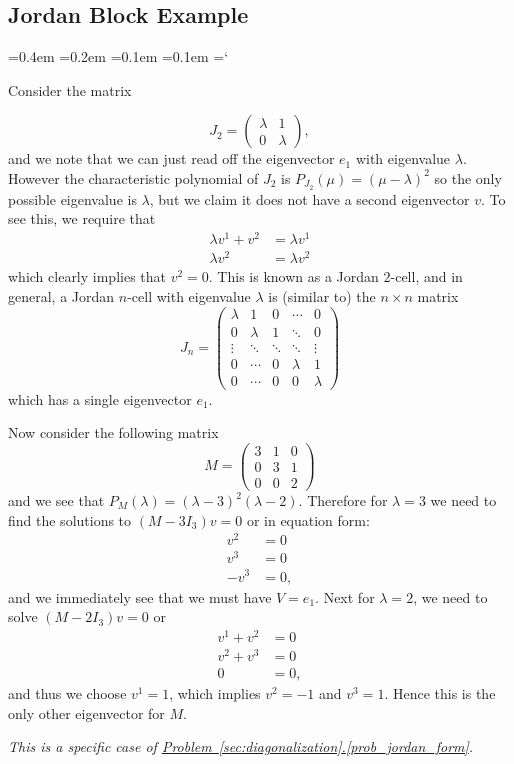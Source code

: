 
\subsection*{Jordan Block Example}

{\ttfamily
{}\font=0.4em
\font=0.2em
\font=0.1em
\font=0.1em
\hyphenchar\font=`\-


\hypertarget{scripts_eigenvalseigenvects_jordan}{Consider the matrix}
\[
J_2 = \begin{pmatrix}
\lambda & 1
\\ 0 & \lambda
\end{pmatrix},
\]
and we note that we can just read off the eigenvector $e_1$ with eigenvalue $\lambda$. However the characteristic polynomial of $J_2$ is $P_{J_2}(\mu) = (\mu - \lambda)^2$ so the only possible eigenvalue is $\lambda$, but we claim it does not have a second eigenvector $v$. To see this, we require that
\begin{align*}
\lambda v^1 + v^2 & = \lambda v^1
\\ \lambda v^2 & = \lambda v^2
\end{align*}
which clearly implies that $v^2 = 0$. This is known as a Jordan $2$-cell, and in general, a Jordan $n$-cell with eigenvalue $\lambda$ is (similar to) the $n \times n$ matrix
\[
J_n = \begin{pmatrix}
\lambda & 1 & 0 & \cdots & 0 \\
0 & \lambda & 1 & \ddots & 0 \\
\vdots & \ddots & \ddots & \ddots & \vdots \\
0 & \cdots & 0 & \lambda & 1 \\
0 & \cdots & 0 & 0 & \lambda
\end{pmatrix}
\]
which has a single eigenvector $e_1$.

Now consider the following matrix
\[
M = \begin{pmatrix}
3 & 1 & 0 \\
0 & 3 & 1 \\
0 & 0 & 2
\end{pmatrix}
\]
and we see that $P_M(\lambda) = (\lambda - 3)^2(\lambda - 2)$. Therefore for $\lambda = 3$ we need to find the solutions to $(M - 3I_3)v = 0$ or in equation form:
\begin{align*}
v^2 & = 0
\\ v^3 & = 0
\\ -v^3 & = 0,
\end{align*}
and we immediately see that we must have $V = e_1$. Next for $\lambda = 2$, we need to solve $(M - 2I_3)v = 0$ or 
\begin{align*}
v^1 + v^2 & = 0
\\ v^2 + v^3 & = 0
\\ 0 & = 0,
\end{align*}
and thus we choose $v^1 = 1$, which implies $v^2 = -1$ and $v^3 = 1$. Hence this is the only other eigenvector for $M$.

\emph{This is a specific case of \hyperref[prob_jordan_form]{Problem~\ref*{sec:diagonalization}.\ref*{prob_jordan_form}}.}

} %

